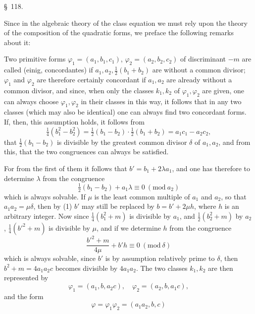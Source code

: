 \begin{center}
\S\ 118. \textbf{}
\end{center}

Since in the algebraic theory of the class equation we must rely upon the theory of the composition of the quadratic forms, we preface the following remarks about it:

Two primitive forms $\varphi_1=(a_1,b_1,c_1)$, $\varphi_2=(a_2,b_2,c_2)$ of discriminant $-m$ are called  (einig, concordantes) if $a_1,a_2,\tfrac{1}{2}(b_1+b_2)$ are without a common divisor; $\varphi_1$ and $\varphi_2$ are therefore certainly concordant if $a_1,a_2$ are already without a common divisor, and since, when only the classes $k_1,k_2$ of $\varphi_1,\varphi_2$ are given, one can always choose $\varphi_1,\varphi_2$ in their classes in this way, it follows that in any two classes (which may also be identical) one can always find two concordant forms. If, then, this assumption holds, it follows from
\[
\tfrac{1}{4}(b_1^2-b_2^2) = \tfrac{1}{2}(b_1-b_2)\cdot\tfrac{1}{2}(b_1+b_2) = a_1c_1-a_2c_2,
\]
that $\tfrac{1}{2}(b_1-b_2)$ is divisible by the greatest common divisor $\delta$ of $a_1,a_2$, and from this, that the two congruences
can always be satisfied.

For from the first of them it follows that $b'=b_1+2\lambda a_1$, and one has therefore to determine $\lambda$ from the congruence
\[
\tfrac{1}{2}(b_1-b_2) + a_1\lambda \equiv 0\ (\mathrm{mod}\ a_2)
\]
which is always solvable. If $\mu$ is the least common multiple of $a_1$ and $a_2$, so that $a_1a_2=\mu\delta$, then by (1) $b'$ may still be replaced by $b=b'+2\mu h$, where $h$ is an arbitrary integer. Now since $\tfrac{1}{4}(b_1^2+m)$ is divisible by $a_1$, and $\tfrac{1}{2}(b_2^2+m)$ by $a_2$, %
$\tfrac{1}{4}(b'^2+m)$ is divisible by $\mu$, and if we determine $h$ from the congruence
\[
\frac{b'^2+m}{4\mu} + b'h \equiv 0\ (\mathrm{mod}\ \delta)
\]
which is always solvable, since $b'$ is by assumption relatively prime to $\delta$, then $b^2+m=4a_1a_2c$ becomes divisible by $4a_1a_2$. The two classes $k_1,k_2$ are then represented by
\[
\varphi_1=(a_1,b,a_2c), \quad \varphi_2=(a_2,b,a_1c),
\]
and the form
\[
\varphi = \varphi_1\varphi_2 = (a_1a_2,b,c)
\]

